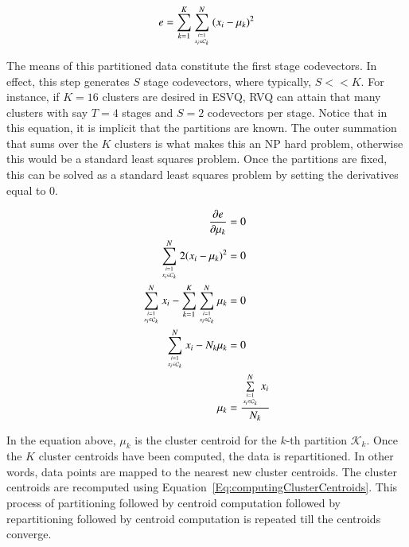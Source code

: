 \begin{Body}
\begin{enumerate}
\begin{enumerate}
\begin{equation}
\label{Eq:KmeansError}
e = \sum\limits_{k=1}^K \sum\limits_{{i=1 \atop x_i \in \mathcal{C}_k}}^N {(x_i - \mu_k)}^2
\end{equation}

The means of this partitioned data constitute the first stage codevectors.  In effect, this step generates $S$ stage codevectors, where typically, $S << K$.  For instance, if $K=16$ clusters are desired in ESVQ, RVQ can attain that many clusters with say $T=4$ stages and $S=2$ codevectors per stage.  Notice that in this equation, it is implicit that the partitions are known.  The outer summation that sums over the $K$ clusters is what makes this an NP hard problem, otherwise this would be a standard least squares problem.  Once the partitions are fixed, this can be solved as a standard least squares problem by setting the derivatives equal to 0.  

\begin{align}
\frac{\partial{e}}{\partial{\mu_k}} &= 0\notag\\
\sum\limits_{{i=1 \atop x_i \in \mathcal{C}_k}}^N 2 {(x_i - \mu_k)}^2 &= 0\notag\\
\sum\limits_{{i=1 \atop x_i \in \mathcal{C}_k}}^N x_i - \sum\limits_{k=1}^K \sum\limits_{{i=1 \atop x_i \in \mathcal{C}_k}}^N \mu_k &= 0\notag\\
\sum\limits_{{i=1 \atop x_i \in \mathcal{C}_k}}^N x_i - N_k \mu_k &= 0\notag\\
\mu_k &= \frac{\sum\limits_{{i=1 \atop x_i \in \mathcal{C}_k}}^N x_i}{N_k}
\label{Eq:computingClusterCentroids}
\end{align}

In the equation above, $\mu_k$ is the cluster centroid for the $k$-th partition $\mathcal{K}_k$.  Once the $K$ cluster centroids have been computed, the data is repartitioned.  In other words, data points are mapped to the nearest new cluster centroids.  The cluster centroids are recomputed using Equation~\ref{Eq:computingClusterCentroids}.  This process of partitioning followed by centroid computation followed by repartitioning followed by centroid computation is repeated till the centroids converge.


\end{enumerate}
\end{enumerate}
\end{Body}
